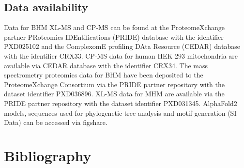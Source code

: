 \documentclass[times, twoside]{zHenriquesLab-StyleBioRxiv}
\begin{document}
\subsection*{Data availability}
Data for BHM XL-MS and CP-MS can be found at the ProteomeXchange partner PRoteomics IDEntifications (PRIDE) database with the identifier PXD025102 and the ComplexomE profiling DAta Resource (CEDAR) database with the identifier CRX33. CP-MS data for human HEK 293 mitochondria are available via CEDAR database with the identifier CRX34. The mass spectrometry proteomics data for BHM have been deposited to the ProteomeXchange Consortium via the PRIDE partner repository with the dataset identifier PXD036896. XL-MS data for MHM are available via the PRIDE partner repository with the dataset identifier PXD031345. AlphaFold2 models, sequences used for phylogenetic tree analysis and motif generation (SI Data) can be accessed via figshare.

\section*{Bibliography}

\end{document}

